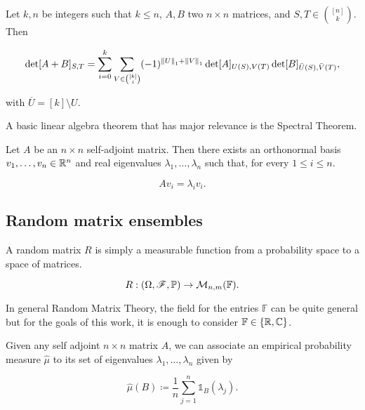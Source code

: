 \begin{theorem} \label{thm:marcus_binet}
    Let $k,n$ be integers such that $k\le n$, $A,B$ two $n\times n$ matrices, and $S,T \in \binom{[n]}{k}$. Then
    
    \begin{equation*}
        \det[A+B]_{S,T} = \sum_{i=0}^k \sum_{V \in \binom{[k]}{i}} (-1)^{\left\lVert U\right\rVert_1 + \left\lVert V\right\rVert_1} \det[A]_{U(S),V(T)}\det[B]_{\bar{U}(S),\bar{V}(T)},
    \end{equation*}

    \noindent with $\overline U = [k] \setminus U$.
\end{theorem}

A basic linear algebra theorem that has major relevance is the Spectral Theorem.

\begin{theorem}
    Let $A$ be an $n\times n$ self-adjoint matrix. Then there exists an orthonormal basis $v_1, \dots, v_n \in \mathbb R^n$ and real eigenvalues $\lambda_1, \dots, \lambda_n$ such that, for every $1 \le i \le n$. 

    \begin{equation*}
        A v_i = \lambda_i v_i.
    \end{equation*}
\end{theorem}


\subsection{Random matrix ensembles}

A random matrix $R$ is simply a measurable function from a probability space to a space of matrices.

\begin{equation*}
    R: (\Omega,\mathscr F, \mathbb P) \to \mathcal M_{n,m}(\mathbb F).
\end{equation*}

In general Random Matrix Theory, the field for the entries $\mathbb F$ can be quite general but for the goals of this work, it is enough to consider $\mathbb F \in \{\mathbb R, \mathbb C\}$. 

Given any self adjoint $n\times n$ matrix $A$, we can associate an empirical probability measure $\hat\mu$ to its set of eigenvalues $\lambda_1, \dots, \lambda_n$ given by

\begin{equation*}
    \hat\mu( B ) \coloneqq \frac1n \sum_{j=1}^n \mathds 1_B(\lambda_j).
\end{equation*}

